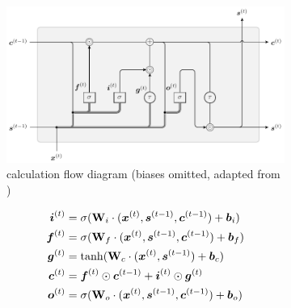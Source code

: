 \begin{figure}[H]
  \centering
  \begin{subfigure}[]{\textwidth}
    \begin{center}
    \includegraphics[]{figs/lstm.pdf}
    \end{center}
    \caption{calculation flow diagram (biases omitted, adapted from \cite{Colah2015})}
    \label{fig:lstm} 
  \end{subfigure}
  \begin{subfigure}[]{\textwidth}
    \begin{subequations}
      \begin{align}
        \vc{i}\tm{t} 
        &= 
          \sigma
          (
          \mt{W}_i \cdot
          (
          \x\tm{t},
          \vc{s}\tm{t-1},
          \vc{c}\tm{t-1}
          )
          +\vc{b}_i
          ) 
        \\
        \vc{f}\tm{t} 
        &=
          \sigma
          (
          \mt{W}_f \cdot
          (
          \x\tm{t},
          \vc{s}\tm{t-1},
          \vc{c}\tm{t-1}
          )
          +\vc{b}_f
          )
        \\
        \vc{g}\tm{t}
        &=
          \tanh
          (
          \mt{W}_c \cdot
          (
          \x\tm{t},
          \vc{s}\tm{t-1}
          )
          +\vc{b}_c
          )
        \\
        \vc{c}\tm{t} 
        &= 
          \vc{f}\tm{t}   \odot \vc{c}\tm{t-1}
          + \vc{i}\tm{t} \odot \vc{g}\tm{t}
        \label{eqn:lstms}\\
        \vc{o}\tm{t}
        &=
          \sigma
          (
          \mt{W}_o \cdot
          (
          \x\tm{t},
          \vc{s}\tm{t-1},
          \vc{c}\tm{t-1}
          )
          +\vc{b}_o
          )
        \\

\end{align}
\end{subequations}
\end{subfigure}
\end{figure}
